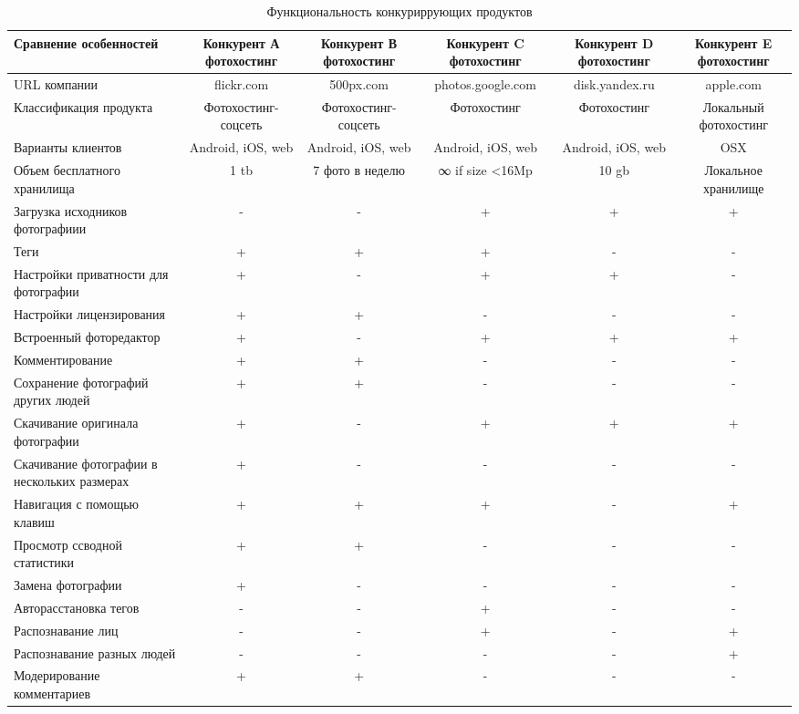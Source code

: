 \begin{table}[H]
  \caption{Функциональность конкуриррующих продуктов}\label{comp-table}
  \begin{tabular}{|l{4cm}|c|c|c|c|c|}
  \hline Сравнение особенностей & Конкурент А фотохостинг & Конкурент В фотохостинг & Конкурент C фотохостинг & Конкурент D фотохостинг & Конкурент E фотохостинг \\ 
  \hline URL компании & flickr.com & 500px.com & photos.google.com & disk.yandex.ru & apple.com \\ 
  \hline Классификация продукта & Фотохостинг-соцсеть & Фотохостинг-соцсеть & Фотохостинг & Фотохостинг & Локальный фотохостинг \\ 
  \hline Варианты клиентов & Android, iOS, web & Android, iOS, web & Android, iOS, web & Android, iOS, web & OSX \\ 
  \hline Объем бесплатного хранилища & 1 tb & 7 фото в неделю & ∞ if size <16Mp & 10 gb & Локальное хранилище \\ 
  \hline Загрузка исходников фотографиии & - & - & + & + & + \\ 
  \hline Теги & + & + & + & - & - \\ 
  \hline Настройки приватности для фотографии & + & - & + & + & - \\ 
  \hline Настройки лицензирования & + & + & - & - & - \\ 
  \hline Встроенный фоторедактор & + & - & + & + & + \\ 
  \hline Комментирование & + & + & - & - & - \\ 
  \hline Сохранение фотографий других людей & + & + & - & - & - \\ 
  \hline Скачивание оригинала фотографии & + & - & + & + & + \\ 
  \hline Скачивание фотографии в нескольких размерах & + & - & - & - & - \\ 
  \hline Навигация с помощью клавиш & + & + & + & - & + \\ 
  \hline Просмотр ссводной статистики & + & + & - & - & - \\ 
  \hline Замена фотографии & + & - & - & - & - \\ 
  \hline Авторасстановка тегов & - & - & + & - & - \\ 
  \hline Распознавание лиц & - & - & + & - & + \\ 
  \hline Распознавание разных людей & - & - & - & - & + \\ 
  \hline Модерирование комментариев & + & + & - & - & - \\ 

\end{tabular}
\end{table}
